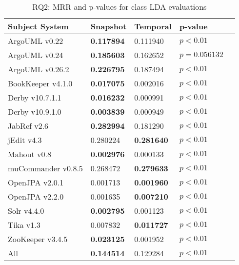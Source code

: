
\begin{table}[t]
\renewcommand{\arraystretch}{1.3}
\footnotesize
\centering
\caption{RQ2: MRR and p-values for class LDA evaluations}
\begin{tabular}{l|ll|ll}
   \toprule
    Subject System & Snapshot & Temporal & p-value  \\
    \midrule

ArgoUML v0.22 & {\bf 0.117894 } & 0.111940 & $p < 0.01$ \\
ArgoUML v0.24 & {\bf 0.185603 } & 0.162652 & $p = 0.056132$ \\
ArgoUML v0.26.2 & {\bf 0.226795 } & 0.187494 & $p < 0.01$ \\
BookKeeper v4.1.0 & {\bf 0.017075 } & 0.002016 & $p < 0.01$ \\
Derby v10.7.1.1 & {\bf 0.016232 } & 0.000991 & $p < 0.01$ \\
Derby v10.9.1.0 & {\bf 0.003839 } & 0.000949 & $p < 0.01$ \\
JabRef v2.6 & {\bf 0.282994 } & 0.181290 & $p < 0.01$ \\
jEdit v4.3 & 0.280224 & {\bf 0.281640 } & $p < 0.01$ \\
Mahout v0.8 & {\bf 0.002976 } & 0.000133 & $p < 0.01$ \\
muCommander v0.8.5 & 0.268472 & {\bf 0.279633 } & $p < 0.01$ \\
OpenJPA v2.0.1 & 0.001713 & {\bf 0.001960 } & $p < 0.01$ \\
OpenJPA v2.2.0 & 0.001635 & {\bf 0.007210 } & $p < 0.01$ \\
Solr v4.4.0 & {\bf 0.002795 } & 0.001123 & $p < 0.01$ \\
Tika v1.3 & 0.007832 & {\bf 0.011727 } & $p < 0.01$ \\
ZooKeeper v3.4.5 & {\bf 0.023125 } & 0.001952 & $p < 0.01$ \\
\midrule
All & {\bf 0.144514 } & 0.129284 & $p < 0.01$ \\

    \bottomrule
\end{tabular}
\label{table:rq2:class:lda}
\end{table}

